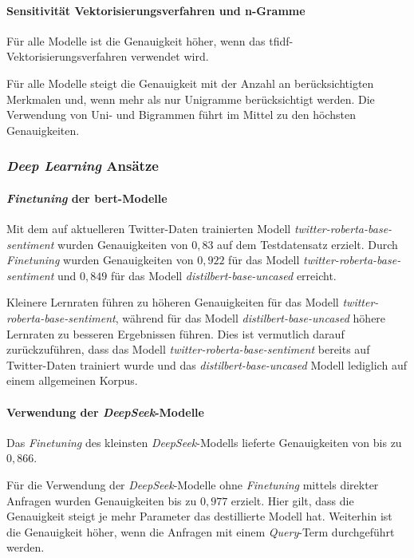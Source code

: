 \paragraph{Sensitivität Vektorisierungsverfahren und n-Gramme}

Für alle Modelle ist die Genauigkeit höher, wenn das \gls{tfidf}-Vektorisierungsverfahren verwendet wird.

Für alle Modelle steigt die Genauigkeit mit der Anzahl an berücksichtigten Merkmalen und, wenn mehr als nur Unigramme berücksichtigt werden.
Die Verwendung von Uni- und Bigrammen führt im Mittel zu den höchsten Genauigkeiten.

\subsubsection{\textit{Deep Learning} Ansätze}\label{subsubsec:ergebnisse-deep-learning-ansaetze}

\paragraph{\textit{Finetuning} der \gls{bert}-Modelle}
Mit dem auf aktuelleren Twitter-Daten trainierten Modell \textit{twitter-roberta-base-sentiment} wurden Genauigkeiten von $0,83$ auf dem Testdatensatz erzielt.
Durch \textit{Finetuning} wurden Genauigkeiten von $0,922$ für das Modell \textit{twitter-roberta-base-sentiment} und $0,849$ für das Modell \textit{distilbert-base-uncased} erreicht.

Kleinere Lernraten führen zu höheren Genauigkeiten für das Modell \textit{twitter-roberta-base-sentiment}, während für das Modell \textit{distilbert-base-uncased} höhere Lernraten zu besseren Ergebnissen führen.
Dies ist vermutlich darauf zurückzuführen, dass das Modell \textit{twitter-roberta-base-sentiment} bereits auf Twitter-Daten trainiert wurde und das \textit{distilbert-base-uncased} Modell lediglich auf einem allgemeinen Korpus.

\paragraph{Verwendung der \textit{DeepSeek}-Modelle}
Das \textit{Finetuning} des kleinsten \textit{DeepSeek}-Modells lieferte Genauigkeiten von bis zu $0,866$.

Für die Verwendung der \textit{DeepSeek}-Modelle ohne \textit{Finetuning} mittels direkter Anfragen wurden Genauigkeiten bis zu $0,977$ erzielt.
Hier gilt, dass die Genauigkeit steigt je mehr Parameter das destillierte Modell hat.
Weiterhin ist die Genauigkeit höher, wenn die Anfragen mit einem \textit{Query}-Term durchgeführt werden.

